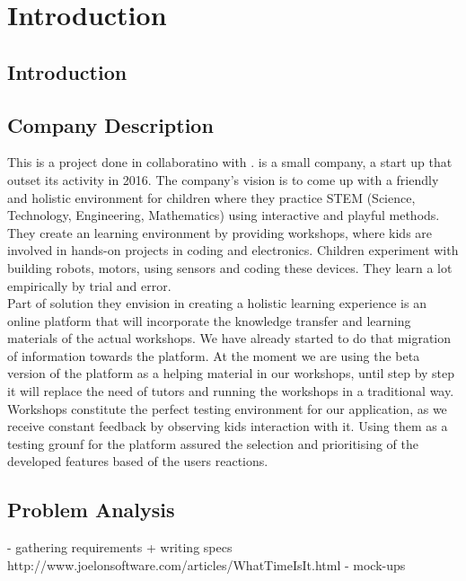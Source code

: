 
\chapter{Introduction}
\section{Introduction}

\section{Company Description}

This is a project done in collaboratino with \sfun. 
\sfun is a small company, a start up that outset its activity in 2016. The company's vision is to 
come up with a friendly and holistic environment for children where they practice STEM (Science, Technology, Engineering, Mathematics) using interactive and playful methods. \\

They create an learning environment by providing workshops, where kids are involved in hands-on projects in coding and electronics. Children experiment with building robots, motors, using sensors and coding these devices. They learn a lot empirically by trial and error.  \\

Part of solution they envision in creating a holistic learning experience is an online platform that will incorporate the knowledge transfer and learning materials of the actual workshops. We have already started to do that migration of information towards the platform. At the moment we are using the beta version of the platform as a helping material in our workshops, until step by step it will replace the need of tutors and running the workshops in a traditional way. \\

Workshops constitute the perfect testing environment for our application, as we receive constant feedback by observing kids interaction with it. Using them as a testing grounf for the platform assured the selection and prioritising of the developed features based of the users reactions.

\section{Problem Analysis}



- gathering requirements + writing specs http://www.joelonsoftware.com/articles/WhatTimeIsIt.html
- mock-ups




